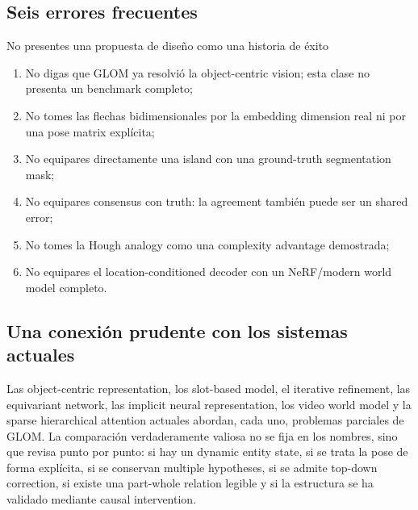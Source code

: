 \documentclass[a4paper]{article}
\begin{document}
\subsection{Seis errores frecuentes}

\begin{warningbox}{No presentes una propuesta de diseño como una historia de éxito}
\begin{enumerate}
  \item No digas que GLOM ya resolvió la object-centric vision; esta clase no presenta un benchmark completo;
  \item No tomes las flechas bidimensionales por la embedding dimension real ni por una pose matrix explícita;
  \item No equipares directamente una island con una ground-truth segmentation mask;
  \item No equipares consensus con truth: la agreement también puede ser un shared error;
  \item No tomes la Hough analogy como una complexity advantage demostrada;
  \item No equipares el location-conditioned decoder con un NeRF/modern world model completo.
\end{enumerate}
\end{warningbox}

\subsection{Una conexión prudente con los sistemas actuales}

Las object-centric representation, los slot-based model, el iterative refinement, las equivariant network, las implicit neural representation, los video world model y la sparse hierarchical attention actuales abordan, cada uno, problemas parciales de GLOM. La comparación verdaderamente valiosa no se fija en los nombres, sino que revisa punto por punto: si hay un dynamic entity state, si se trata la pose de forma explícita, si se conservan multiple hypotheses, si se admite top-down correction, si existe una part-whole relation legible y si la estructura se ha validado mediante causal intervention.

\end{document}
